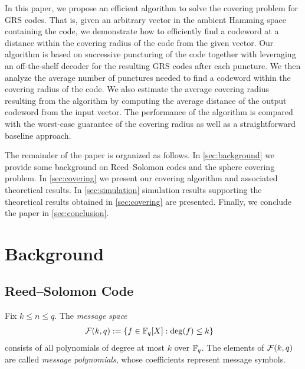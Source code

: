 \documentclass[conference]{IEEEtran}
\begin{document}
In this paper, we propose an efficient algorithm to solve the covering problem for GRS codes. That is, given an arbitrary vector in the ambient Hamming space containing the code, we demonstrate how to efficiently find a codeword at a distance within the covering radius of the code from the given vector. 
Our algorithm is based on successive puncturing of the code together with leveraging an off-the-shelf decoder for the resulting GRS codes after each puncture. We then analyze the average number of punctures needed to find a codeword within the covering radius of the code. 
We also estimate the average covering radius resulting from the algorithm by computing the average distance of the output codeword from the input vector. The performance of the algorithm is compared with the worst-case guarantee of the covering radius as well as a straightforward baseline approach. %




The remainder of the paper is organized as follows. 
In \autoref{sec:background} we provide some background on Reed--Solomon codes and the sphere covering problem. In \autoref{sec:covering} we present our covering algorithm and associated theoretical results. In \autoref{sec:simulation} simulation results supporting the theoretical results obtained in \autoref{sec:covering} are presented. Finally, we conclude the paper in \autoref{sec:conclusion}. 

\section{Background}
\label{sec:background}

\subsection{Reed--Solomon Code}

Fix $k \le n \le q$. The \emph{message space}%
\begin{align*}
    {\mathcal F}(k, q) 
    &:= \{f \in {\mathbb F}_{q}[X]: \deg(f) \le k\} 
\end{align*}
consists of all polynomials of degree at most $k$ over ${\mathbb F}_{q}$. The elements of ${\mathcal F}(k, q)$ are called \emph{message polynomials}, whose coefficients represent message symbols. 
    
\end{document}

